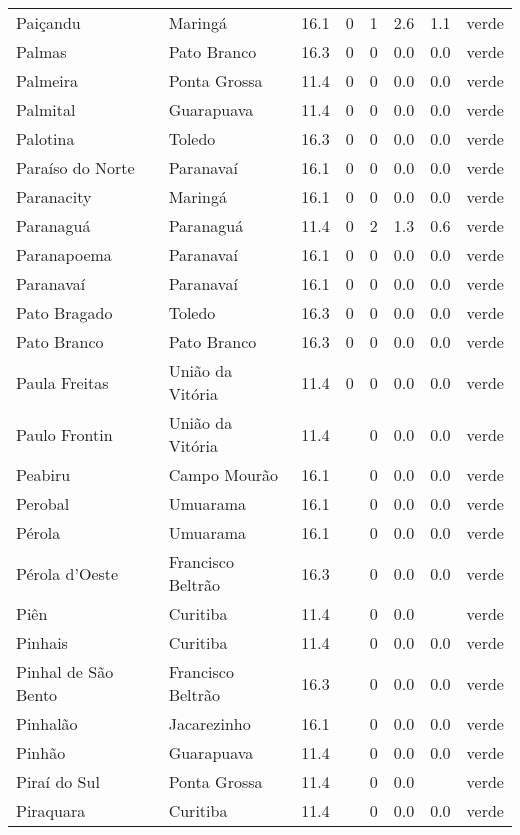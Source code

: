 \begin{longtable}{l|lllllll}
  Paiçandu & Maringá & 16.1 & 0 & 1 & 2.6 & 1.1 & verde \\ 
  Palmas & Pato Branco & 16.3 & 0 & 0 & 0.0 & 0.0 & verde \\ 
  Palmeira & Ponta Grossa & 11.4 & 0 & 0 & 0.0 & 0.0 & verde \\ 
  Palmital & Guarapuava & 11.4 & 0 & 0 & 0.0 & 0.0 & verde \\ 
  Palotina & Toledo & 16.3 & 0 & 0 & 0.0 & 0.0 & verde \\ 
  Paraíso do Norte & Paranavaí & 16.1 & 0 & 0 & 0.0 & 0.0 & verde \\ 
  Paranacity & Maringá & 16.1 & 0 & 0 & 0.0 & 0.0 & verde \\ 
  Paranaguá & Paranaguá & 11.4 & 0 & 2 & 1.3 & 0.6 & verde \\ 
  Paranapoema & Paranavaí & 16.1 & 0 & 0 & 0.0 & 0.0 & verde \\ 
  Paranavaí & Paranavaí & 16.1 & 0 & 0 & 0.0 & 0.0 & verde \\ 
  Pato Bragado & Toledo & 16.3 & 0 & 0 & 0.0 & 0.0 & verde \\ 
  Pato Branco & Pato Branco & 16.3 & 0 & 0 & 0.0 & 0.0 & verde \\ 
  Paula Freitas & União da Vitória & 11.4 & 0 & 0 & 0.0 & 0.0 & verde \\ 
  Paulo Frontin & União da Vitória & 11.4 &  & 0 & 0.0 & 0.0 & verde \\ 
  Peabiru & Campo Mourão & 16.1 &  & 0 & 0.0 & 0.0 & verde \\ 
  Perobal & Umuarama & 16.1 &  & 0 & 0.0 & 0.0 & verde \\ 
  Pérola & Umuarama & 16.1 &  & 0 & 0.0 & 0.0 & verde \\ 
  Pérola d'Oeste & Francisco Beltrão & 16.3 &  & 0 & 0.0 & 0.0 & verde \\ 
  Piên & Curitiba & 11.4 &  & 0 & 0.0 &  & verde \\ 
  Pinhais & Curitiba & 11.4 &  & 0 & 0.0 & 0.0 & verde \\ 
  Pinhal de São Bento & Francisco Beltrão & 16.3 &  & 0 & 0.0 & 0.0 & verde \\ 
  Pinhalão & Jacarezinho & 16.1 &  & 0 & 0.0 & 0.0 & verde \\ 
  Pinhão & Guarapuava & 11.4 &  & 0 & 0.0 & 0.0 & verde \\ 
  Piraí do Sul & Ponta Grossa & 11.4 &  & 0 & 0.0 &  & verde \\ 
  Piraquara & Curitiba & 11.4 &  & 0 & 0.0 & 0.0 & verde \\ 

\end{longtable}
